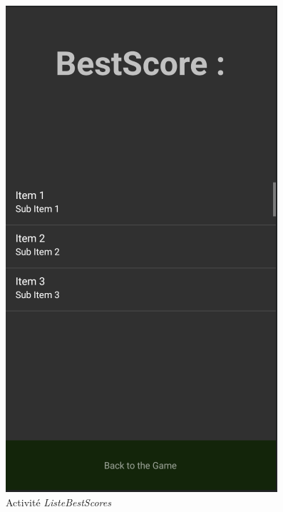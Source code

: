 \documentclass{article}
\begin{document}
\begin{figure}[H]
\begin{minipage}[c]{.4\linewidth}
        \includegraphics[scale=0.33]{ListeBestScore.png}
        \caption{Activité \textit{ListeBestScores}}
    \end{minipage}
\end{figure}
\end{document}
